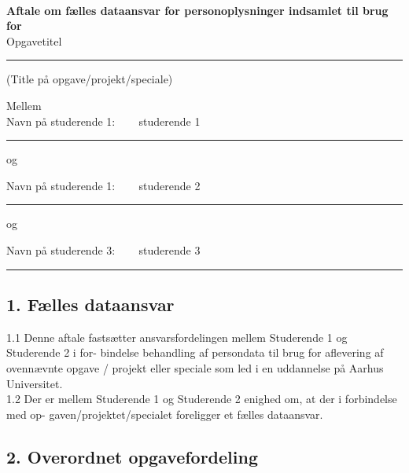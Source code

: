 \documentclass[11pt, a4paper]{article}
\newcommand{\opgavetitel}{ Opgavetitel }	 		%
\newcommand{\studerendeET}{ studerende 1 }	 		%
\newcommand{\studerendeTO}{ studerende 2 }	 		%
\newcommand{\studerendeTRE}{ studerende 3 }	 		%
\begin{document}
\pagestyle{fancy}
~
\vspace{1cm}

\textbf{Aftale om fælles dataansvar for personoplysninger indsamlet til brug for}~\\



\opgavetitel
\hrule
\vspace{2mm}
(Title på opgave/projekt/speciale)

\vspace{5mm}


Mellem\\ 

Navn på studerende 1: ~~~\studerendeET
\vspace{1mm}
\hrule

\vspace{5mm}

og 
\vspace{5mm}

Navn på studerende 1: ~~~\studerendeTO
\vspace{1mm}
\hrule

\vspace{5mm}

og 
\vspace{5mm}

Navn på studerende 3: ~~~\studerendeTRE
\vspace{1mm}
\hrule

\vspace{5mm}


\newpage
\subsection*{1. Fælles dataansvar}

1.1 Denne aftale fastsætter ansvarsfordelingen mellem Studerende 1 og Studerende 2 i for- bindelse behandling af persondata til brug for aflevering af ovennævnte opgave / projekt eller speciale som led i en uddannelse på Aarhus Universitet.\\

1.2 Der er mellem Studerende 1 og Studerende 2 enighed om, at der i forbindelse med op- gaven/projektet/specialet foreligger et fælles dataansvar.

\subsection*{2. Overordnet opgavefordeling}
\end{document}
